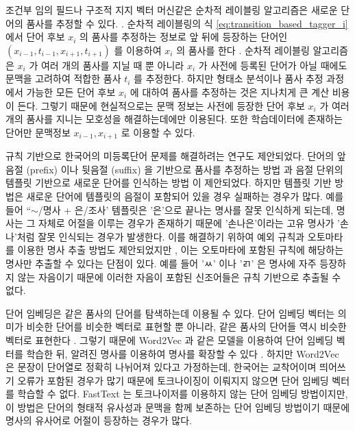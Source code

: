 \documentclass[oneside, ko,phd]{snuthesis_utf8_kor}
\begin{document}
조건부 임의 필드나 구조적 지지 벡터 머신같은 순차적 레이블링 알고리즘은 새로운 단어의 품사를 추정할 수 있다. \cite{shim2004high, shim2007made, na2012crfs, lee2013joint}.
순차적 레이블링의 식 \ref{eq:transition_based_tagger_i} 에서 단어 후보 $x_i$ 의 품사를 추정하는 정보로 앞 뒤에 등장하는 단어인 $(x_{i-1}, t_{i-1}, x_{i+1}, t_{i+1})$ 를 이용하여 $x_i$ 의 품사를 한다 \cite{shim2004high, shim2007made, na2012crfs, lee2013joint}.
순차적 레이블링 알고리즘은 $x_i$ 가 여러 개의 품사를 지닐 때 뿐 아니라 $x_i$ 가 사전에 등록된 단어가 아닐 때에도 문맥을 고려하여 적합한 품사 $t_i$ 를 추정한다.
하지만 형태소 분석이나 품사 추정 과정에서 가능한 모든 단어 후보 $x_i$ 에 대하여 품사를 추정하는 것은 지나치게 큰 계산 비용이 든다.
그렇기 때문에 현실적으로는 문맥 정보는 사전에 등장한 단어 후보 $x_i$ 가 여러 개의 품사를 지니는 모호성을 해결하는데에만 이용된다.
또한 학습데이터에 존재하는 단어만 문맥정보 $x_{i-1}, x_{i+1}$ 로 이용할 수 있다.

규칙 기반으로 한국어의 미등록단어 문제를 해결하려는 연구도 제안되었다.
단어의 앞음절 (prefix) 이나 뒷음절 (suffix) 을 기반으로 품사를 추정하는 방법 \cite{Lee2016functional} 과 음절 단위의 템플릿 기반으로 새로운 단어를 인식하는 방법 \cite{hong2008new} 이 제안되었다.
하지만 템플릿 기반 방법은 새로운 단어에 템플릿의 음절이 포함되어 있을 경우 실패하는 경우가 많다.
예를 들어 “$\sim$/명사 + 은/조사' 템플릿은 '은'으로 끝나는 명사를 잘못 인식하게 되는데, 명사는 그 자체로 어절을 이루는 경우가 존재하기 때문에 '손나은'이라는 고유 명사가 '손나'처럼 잘못 인식되는 경우가 발생한다.
이를 해결하기 위하여 예외 규칙과 오토마타를 이용한 명사 추출 방법도 제안되었지만 \cite{lee2003efficient}, 이는 오토마타에 포함된 규칙에 해당하는 명사만 추출할 수 있다는 단점이 있다.
예를 들어 'ㅆ' 이나 'ㄺ' 은 명사에 자주 등장하지 않는 자음이기 때문에 이러한 자음이 포함된 신조어들은 규칙 기반으로 추출될 수 없다.

단어 임베딩은 같은 품사의 단어를 탐색하는데 이용될 수 있다.
단어 임베딩 벡터는 의미가 비슷한 단어를 비슷한 벡터로 표현할 뿐 아니라, 같은 품사의 단어들 역시 비슷한 벡터로 표현한다 \cite{bengio2003neural}.
그렇기 때문에 Word2Vec 과 같은 모델을 이용하여 단어 임베딩 벡터를 학습한 뒤, 알려진 명사를 이용하여 명사를 확장할 수 있다 \cite{mikolov2013distributed} .
하지만 Word2Vec 은 문장이 단어열로 정확히 나뉘어져 있다고 가정하는데, 한국어는 교착어이며 띄어쓰기 오류가 포함된 경우가 많기 때문에 토크나이징이 이뤄지지 않으면 단어 임베딩 벡터를 학습할 수 없다.
FastText \cite{bojanowski2017enriching} 는 토크나이저를 이용하지 않는 단어 임베딩 방법이지만, 이 방법은 단어의 형태적 유사성과 문맥을 함께 보존하는 단어 임베딩 방법이기 때문에 명사의 유사어로 어절이 등장하는 경우가 많다.
\end{document}
